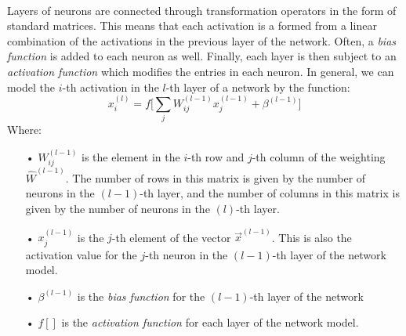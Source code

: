 \documentclass[12pt,letterpaper]{article}
\begin{document}
\paragraph*{}Layers of neurons are connected through transformation operators in the form of standard matrices. This means that each activation is a formed from a linear combination of the activations in the previous layer of the network. Often, a \textit{bias function} is added to each neuron as well. Finally, each layer is then subject to an \textit{activation function} which modifies the entries in each neuron. In general, we can model the $i$-th activation in the $l$-th layer of a network by the function:
\begin{equation}
\label{forward-prop}
x^{(l)}_{i} = f \Big[ \sum_j W_{ij}^{(l-1)} x^{(l-1)}_{j} + \beta^{(l-1)}\Big]
\end{equation}
Where:
\begin{itemize}
\item[•]$W_{ij}^{(l-1)}$ is the element in the $i$-th row and $j$-th column of the weighting $\hat{W}^{(l-1)}$. The number of rows in this matrix is given by the number of neurons in the $(l-1)$-th layer, and the number of columns in this matrix is given by the number of neurons in the $(l)$-th layer.
\item[•]$x^{(l-1)}_{j}$ is the $j$-th element of the vector $\vec{x}^{(l-1)}$. This is also the activation value for the $j$-th neuron in the $(l-1)$-th layer of the network model.
\item[•]$\beta^{(l-1)}$ is the \textit{bias function} for the $(l-1)$-th layer of the network
\item[•]$f[ ] $ is the \textit{activation function} for each layer of the network model.
\end{itemize} 
\end{document}
